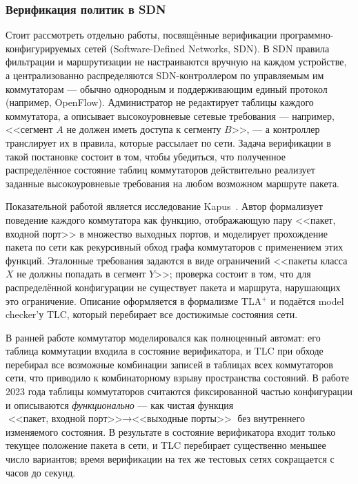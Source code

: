 \subsubsection{Верификация политик в SDN}
\label{sec:Section2:distributed}

Стоит рассмотреть отдельно работы, посвящённые верификации программно-конфигурируемых сетей (Software-Defined Networks, SDN). В SDN правила фильтрации и маршрутизации не настраиваются вручную на каждом устройстве, а централизованно распределяются SDN-контроллером по управляемым им коммутаторам --- обычно однородным и поддерживающим единый протокол (например, OpenFlow). Администратор не редактирует таблицы каждого коммутатора, а описывает высокоуровневые сетевые требования --- например, <<сегмент $A$ не должен иметь доступа к сегменту $B$>>, --- а контроллер транслирует их в правила, которые рассылает по сети. Задача верификации в такой постановке состоит в том, чтобы убедиться, что полученное распределённое состояние таблиц коммутаторов действительно реализует заданные высокоуровневые требования на любом возможном маршруте пакета.

Показательной работой является исследование Kapus~\cite{kapus2023improved}. Автор формализует поведение каждого коммутатора как функцию, отображающую пару <<пакет, входной порт>> в множество выходных портов, и моделирует прохождение пакета по сети как рекурсивный обход графа коммутаторов с применением этих функций. Эталонные требования задаются в виде ограничений <<пакеты класса $X$ не должны попадать в сегмент $Y$>>; проверка состоит в том, что для распределённой конфигурации не существует пакета и маршрута, нарушающих это ограничение. Описание оформляется в формализме TLA$^+$ и подаётся model checker'у TLC, который перебирает все достижимые состояния сети.

В ранней работе коммутатор моделировался как полноценный автомат: его таблица коммутации входила в состояние верификатора, и TLC при обходе перебирал все возможные комбинации записей в таблицах всех коммутаторов сети, что приводило к комбинаторному взрыву пространства состояний. В работе 2023 года таблицы коммутаторов считаются фиксированной частью конфигурации и описываются \emph{функционально} --- как чистая функция $\text{<<пакет, входной порт>>} \rightarrow \text{<<выходные порты>>}$ без внутреннего изменяемого состояния. В результате в состояние верификатора входит только текущее положение пакета в сети, и TLC перебирает существенно меньшее число вариантов; время верификации на тех же тестовых сетях сокращается с часов до секунд.


